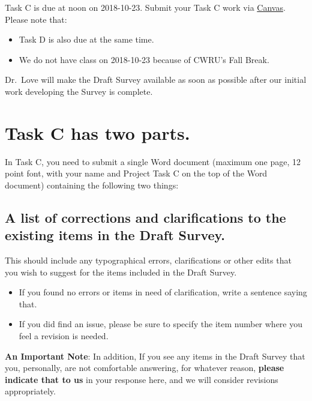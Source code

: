 \documentclass[]{book}
\providecommand{\tightlist}{%
  \setlength{\itemsep}{0pt}\setlength{\parskip}{0pt}}
\theoremstyle{definition}
\theoremstyle{definition}
\theoremstyle{definition}
\theoremstyle{remark}
\begin{document}
Task C is due at noon on 2018-10-23. Submit your Task C work via
\href{https://canvas.case.edu/}{Canvas}. Please note that:

\begin{itemize}
\tightlist
\item
  Task D is also due at the same time.
\item
  We do not have class on 2018-10-23 because of CWRU's Fall Break.
\end{itemize}

Dr.~Love will make the Draft Survey available as soon as possible after
our initial work developing the Survey is complete.

\hypertarget{task-c-has-two-parts.}{%
\section{Task C has two parts.}\label{task-c-has-two-parts.}}

In Task C, you need to submit a single Word document (maximum one page,
12 point font, with your name and Project Task C on the top of the Word
document) containing the following two things:

\hypertarget{a-list-of-corrections-and-clarifications-to-the-existing-items-in-the-draft-survey.}{%
\subsection{A list of corrections and clarifications to the existing
items in the Draft
Survey.}\label{a-list-of-corrections-and-clarifications-to-the-existing-items-in-the-draft-survey.}}

This should include any typographical errors, clarifications or other
edits that you wish to suggest for the items included in the Draft
Survey.

\begin{itemize}
\tightlist
\item
  If you found no errors or items in need of clarification, write a
  sentence saying that.
\item
  If you did find an issue, please be sure to specify the item number
  where you feel a revision is needed.
\end{itemize}

\textbf{An Important Note}: In addition, If you see any items in the
Draft Survey that you, personally, are not comfortable answering, for
whatever reason, \textbf{please indicate that to us} in your response
here, and we will consider revisions appropriately.
\end{document}
